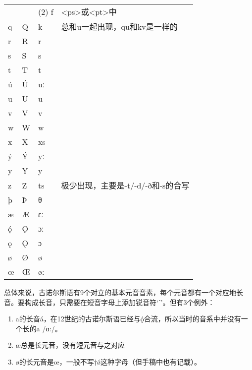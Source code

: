 \begin{table}[H]
\begin{tabular}{@{}llll@{}}
         &      & (2) f    & <ps>或<pt>中             \\
    q    & Q    & k        & 总和u一起出现，qu和kv是一样的      \\
    r    & R    & r        &                        \\
    s    & S    & s        &                        \\
    t    & T    & t        &                        \\
    ú    & Ú    & uː       &                        \\
    u    & U    & u        &                        \\
    v    & V    & v        &                        \\
    w    & W    & w        &                        \\
    x    & X    & xs       &                        \\
    ý    & Ý    & yː       &                        \\
    y    & Y    & y        &                        \\
    z    & Z    & ts       & 极少出现，主要是-t/-d/-ð和-s的合写 \\
    þ    & Þ    & θ        &                        \\
    æ    & Æ    & ɛː       &                        \\
    ǫ́    & Ǫ́    & ɔː       &                        \\
    ǫ    & Ǫ    & ɔ        &                        \\
    ø    & Ø    & ø        &                        \\
    œ    & Œ    & øː       &                        \\ \bottomrule
  \end{tabular}
\end{table}

总体来说，古诺尔斯语有9个对立的基本元音音素，每个元音都有一个对应地长音。要构成长音，只需要在短音字母上添加锐音符`ˊ'。但有3个例外：
\begin{info}
  \begin{enumerate}
    \item a的长音á，在12世纪的古诺尔斯语已经与ǫ́合流，所以当时的音系中并没有一个长的a /ɑ:/。
    \item æ总是长元音，没有短元音与之对应 \footnotemark
    \item ø的长元音是œ，一般不写†\'{ø}这种字母（但手稿中也有记载）。
  \end{enumerate}
\end{info}

